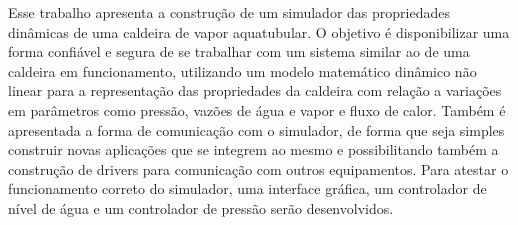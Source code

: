 Esse trabalho apresenta a construção de um simulador das propriedades
dinâmicas de uma caldeira de vapor aquatubular. O objetivo é
disponibilizar uma forma confiável e segura de se trabalhar com um
sistema similar ao de uma caldeira em funcionamento, utilizando um
modelo matemático dinâmico não linear para a representação das
propriedades da caldeira com relação a variações em parâmetros como
pressão, vazões de água e vapor e fluxo de calor. Também é apresentada
a forma de comunicação com o simulador, de forma que seja simples
construir novas aplicações que se integrem ao mesmo e possibilitando
também a construção de drivers para comunicação com outros
equipamentos. Para atestar o funcionamento correto do simulador, uma
interface gráfica, um controlador de nível de água e um controlador de
pressão serão desenvolvidos.
